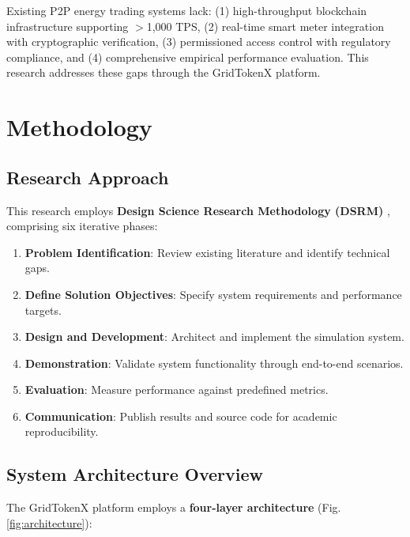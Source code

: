 \documentclass[conference]{IEEEtran}
\begin{document}
Existing P2P energy trading systems lack: (1) high-throughput blockchain infrastructure supporting $>$1,000 TPS, (2) real-time smart meter integration with cryptographic verification, (3) permissioned access control with regulatory compliance, and (4) comprehensive empirical performance evaluation. This research addresses these gaps through the GridTokenX platform.

\section{Methodology}

\subsection{Research Approach}

This research employs \textbf{Design Science Research Methodology (DSRM)} \cite{peffers2007}, comprising six iterative phases:

\begin{enumerate}
    \item \textbf{Problem Identification}: Review existing literature and identify technical gaps.
    \item \textbf{Define Solution Objectives}: Specify system requirements and performance targets.
    \item \textbf{Design and Development}: Architect and implement the simulation system.
    \item \textbf{Demonstration}: Validate system functionality through end-to-end scenarios.
    \item \textbf{Evaluation}: Measure performance against predefined metrics.
    \item \textbf{Communication}: Publish results and source code for academic reproducibility.
\end{enumerate}

\subsection{System Architecture Overview}

The GridTokenX platform employs a \textbf{four-layer architecture} (Fig. \ref{fig:architecture}):
\end{document}
